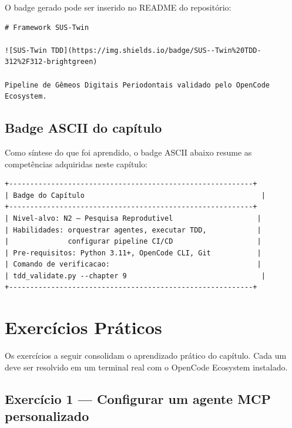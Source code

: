 O badge gerado pode ser inserido no README do repositório:

\begin{lstlisting}[basicstyle=\ttfamily\scriptsize, caption={Inserção do badge no README.md},
label={lst:badge-readme}]
# Framework SUS-Twin

![SUS-Twin TDD](https://img.shields.io/badge/SUS--Twin%20TDD-312%2F312-brightgreen)

Pipeline de Gêmeos Digitais Periodontais validado pelo OpenCode Ecosystem.
\end{lstlisting}

\subsection{Badge ASCII do capítulo}

Como síntese do que foi aprendido, o badge ASCII abaixo resume as
competências adquiridas neste capítulo:

\begin{highlight}
\begin{verbatim}
+----------------------------------------------------------+
| Badge do Capítulo                                          |
+----------------------------------------------------------+
| Nivel-alvo: N2 — Pesquisa Reprodutivel                    |
| Habilidades: orquestrar agentes, executar TDD,            |
|              configurar pipeline CI/CD                    |
| Pre-requisitos: Python 3.11+, OpenCode CLI, Git           |
| Comando de verificacao:                                   |
| tdd_validate.py --chapter 9                                |
+----------------------------------------------------------+
\end{verbatim}
\end{highlight}


\section{Exercícios Práticos}
\label{sec:opencode-exercicios}

Os exercícios a seguir consolidam o aprendizado prático do capítulo. Cada um
deve ser resolvido em um terminal real com o OpenCode Ecosystem instalado.

\subsection*{Exercício 1 — Configurar um agente MCP personalizado}

